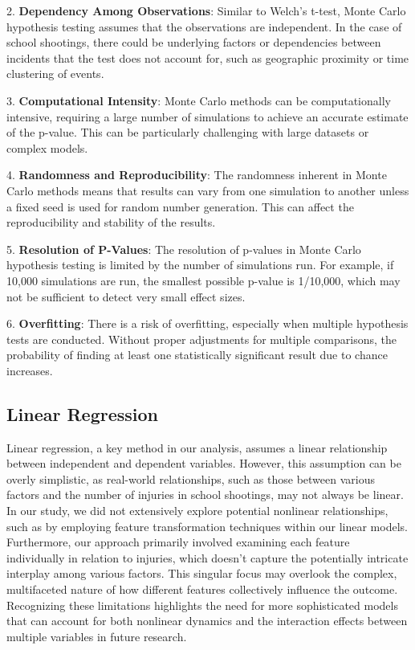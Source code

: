 \documentclass[12pt]{article}
\numberwithin{figure}{section}
\begin{document}
2. \textbf{Dependency Among Observations}: Similar to Welch's t-test, Monte Carlo hypothesis testing assumes that the observations are independent. In the case of school shootings, there could be underlying factors or dependencies between incidents that the test does not account for, such as geographic proximity or time clustering of events.

3. \textbf{Computational Intensity}: Monte Carlo methods can be computationally intensive, requiring a large number of simulations to achieve an accurate estimate of the p-value. This can be particularly challenging with large datasets or complex models.

4. \textbf{Randomness and Reproducibility}: The randomness inherent in Monte Carlo methods means that results can vary from one simulation to another unless a fixed seed is used for random number generation. This can affect the reproducibility and stability of the results.

5. \textbf{Resolution of P-Values}: The resolution of p-values in Monte Carlo hypothesis testing is limited by the number of simulations run. For example, if 10,000 simulations are run, the smallest possible p-value is 1/10,000, which may not be sufficient to detect very small effect sizes.

6. \textbf{Overfitting}: There is a risk of overfitting, especially when multiple hypothesis tests are conducted. Without proper adjustments for multiple comparisons, the probability of finding at least one statistically significant result due to chance increases.


\subsection{Linear Regression}
Linear regression, a key method in our analysis, assumes a linear relationship between independent and dependent variables. However, this assumption can be overly simplistic, as real-world relationships, such as those between various factors and the number of injuries in school shootings, may not always be linear. In our study, we did not extensively explore potential nonlinear relationships, such as by employing feature transformation techniques within our linear models. Furthermore, our approach primarily involved examining each feature individually in relation to injuries, which doesn't capture the potentially intricate interplay among various factors. This singular focus may overlook the complex, multifaceted nature of how different features collectively influence the outcome. Recognizing these limitations highlights the need for more sophisticated models that can account for both nonlinear dynamics and the interaction effects between multiple variables in future research.
\end{document}

